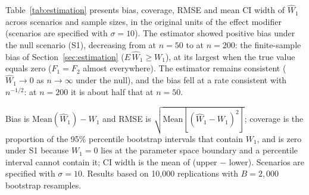 \documentclass[AMA,Times1COL]{WileyNJDv5}
\begin{document}
Table~\ref{tab:estimation} presents bias, coverage, RMSE and mean CI width of $\widehat{W}_1$ across scenarios and sample sizes, in the original units of the effect modifier (scenarios are specified with $\sigma = 10$). The estimator showed positive bias under the null scenario (S1), decreasing from  at $n=50$ to  at $n=200$: the finite-sample bias of Section~\ref{sec:estimation} ($E\,\widehat{W}_1 \geq W_1$), at its largest when the true value equals zero ($F_1 = F_2$ almost everywhere). The estimator remains consistent ($\widehat{W}_1 \to 0$ as $n \to \infty$ under the null), and the bias fell at a rate consistent with $n^{-1/2}$: at $n = 200$ it is about half that at $n = 50$.

\begin{table}[ht]
\centering
\caption{Bias, coverage of the 95\% percentile bootstrap confidence interval, RMSE and mean CI width of $\widehat{W}_1$ by scenario and sample size, in the original units of the effect modifier.\label{tab:estimation}}
\begin{tablenotes}
\item Bias is $\text{Mean}(\widehat{W}_1) - W_1$ and RMSE is $\sqrt{\text{Mean}[(\widehat{W}_1 - W_1)^2]}$; coverage is the proportion of the 95\% percentile bootstrap intervals that contain $W_1$, and is zero under S1 because $W_1 = 0$ lies at the parameter space boundary and a percentile interval cannot contain it; CI width is the mean of (upper $-$ lower). Scenarios are specified with $\sigma = 10$. Results based on 10{,}000 replications with $B = 2{,}000$ bootstrap resamples.
\end{tablenotes}
\end{table}
\end{document}

